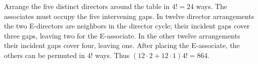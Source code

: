 Arrange the five distinct directors around the table in $4!=24$ ways. The associates must occupy the five intervening gaps. In twelve director arrangements the two E-directors are neighbors in the director cycle; their incident gaps cover three gaps, leaving two for the E-associate. In the other twelve arrangements their incident gaps cover four, leaving one. After placing the E-associate, the others can be permuted in $4!$ ways. Thus $(12\cdot2+12\cdot1)4!=\boxed{864}$.

